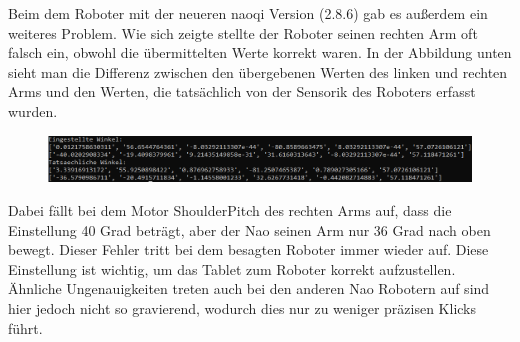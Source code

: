 Beim dem Roboter mit der neueren naoqi Version (2.8.6) gab es außerdem ein weiteres Problem. Wie sich zeigte stellte der Roboter seinen rechten Arm oft falsch ein, obwohl die übermittelten Werte korrekt waren. In der Abbildung unten sieht man die Differenz zwischen den übergebenen Werten des linken und rechten Arms und den Werten, die tatsächlich von der Sensorik des Roboters erfasst wurden. 
\begin{figure}[!htbp]
    \centering
    \includegraphics[width=1\linewidth]{bilder/bilder_movement/WinkelDifferenz.PNG}
\end{figure}
Dabei fällt bei dem Motor ShoulderPitch des rechten Arms auf, dass die Einstellung 40 Grad beträgt, aber der Nao seinen Arm nur 36 Grad nach oben bewegt. Dieser Fehler tritt bei dem besagten Roboter immer wieder auf. Diese Einstellung ist wichtig, um das Tablet zum Roboter korrekt aufzustellen. Ähnliche Ungenauigkeiten treten auch bei den anderen Nao Robotern auf sind hier jedoch nicht so gravierend, wodurch dies nur zu weniger präzisen Klicks führt. 
